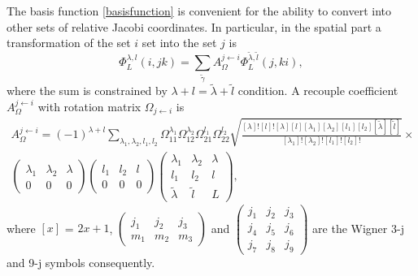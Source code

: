 \documentclass[
11pt, %
english, %
onehalfspacing, %
headsepline, %
]{MastersDoctoralThesis} %
\begin{document}
The basis function \eqref{basisfunction} is convenient for the ability to convert into other sets of relative Jacobi coordinates. In particular, in the spatial part a transformation of the  set $i$ set into the set $j$  is
\begin{equation}
\label{basistransfortmation}
\Phi^{\lambda,l}_L(i,jk)=\sum_{\widetilde{\gamma}} A_{\Omega}^{j \leftarrow i}  \Phi^{\widetilde{\lambda},\widetilde{l}}_L(j,ki),
\end{equation}
where the sum is constrained by $\lambda+l=\widetilde{\lambda}+\widetilde{l}$  condition. A recouple coefficient $A_{\Omega}^{j \leftarrow i}$ with rotation matrix $\Omega_{j \leftarrow i}$ is
\begin{equation}
\begin{gathered}
 A_{\Omega}^{j \leftarrow i} =(-1)^{\lambda+l}  \sum_{\lambda_1, \lambda_2, l_1, l_2}
  \Omega^{\lambda_1}_{11}
  \Omega^{\lambda_2}_{12}
   \Omega^{l_1}_{21}
    \Omega^{l_2}_{22}
   \sqrt{\frac{ [\lambda]! [l]! [\lambda] [l] [\lambda_1] [\lambda_2] [l_1] [l_2] [\widetilde{\lambda}] [\widetilde{l}]  }{   [\lambda_1]!   [\lambda_2]! [l_1]!  [l_2]!  }       }  \times\\
 \begin{pmatrix}
 \lambda_1 & \lambda_2 & {\lambda} \\ 
 0 & 0 & 0
 \end{pmatrix} 
 \begin{pmatrix}
 l_1 & l_2 & {l} \\ 
 0 & 0 & 0
 \end{pmatrix} 
 \begin{pmatrix}
 \lambda_1 & \lambda_2 & \lambda \\ 
 l_1 & l_2 & l \\ 
 \widetilde{\lambda} & \widetilde{l} & L
 \end{pmatrix} ,
 \end{gathered}
\end{equation}
where $[x]$ = $2x+1$, $ \begin{pmatrix}
 j_1 & j_2 & j_3 \\ 
 m_1 & m_2 & m_3
 \end{pmatrix}  $ and $\begin{pmatrix}
 j_1 & j_2 & j_3 \\ 
 j_4 & j_5 & j_6 \\ 
 j_7 & j_8 & j_9
 \end{pmatrix} $ are the Wigner 3-j and 9-j symbols consequently. \\
\end{document}
